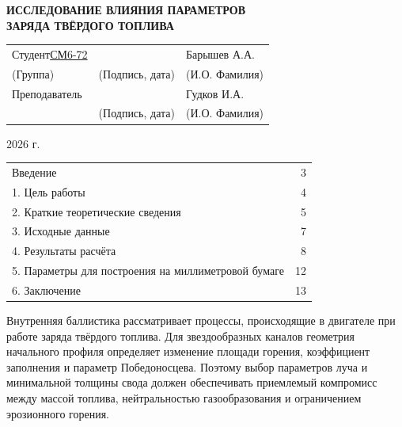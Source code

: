 \documentclass[a4paper,12pt]{article}
\newcommand{\heading}[1]{%
          \par\noindent{\centering\fontsize{16pt}{24pt}\selectfont\bfseries #1\par}%
        }
\begin{document}
\begin{titlepage}
\begin{center}
          {\fontsize{18}{22}\selectfont\bfseries ИССЛЕДОВАНИЕ ВЛИЯНИЯ ПАРАМЕТРОВ}\\
          {\fontsize{18}{22}\selectfont\bfseries ЗАРЯДА ТВЁРДОГО ТОПЛИВА}
        \end{center}
        \vspace{10mm}
        \noindent\begin{tabular}{@{}p{40mm}p{54mm}p{62mm}@{}}
        Студент\hspace{4mm}\underline{СМ6-72} & \hfill\underline{\hspace{36mm}} & Барышев А.А.\\[-1mm]
        \hspace{17mm}(Группа) & \hfill(Подпись, дата) & \hfill(И.О. Фамилия)\\[10mm]
        Преподаватель & \hfill\underline{\hspace{36mm}} & Гудков И.А.\\[-1mm]
        \hspace{28mm} & \hfill(Подпись, дата) & \hfill(И.О. Фамилия)
        \end{tabular}
        \vfill
        \begin{center}2026 г.\end{center}
        \end{titlepage}

        \setcounter{page}{2}
        \heading{Содержание}
        \noindent\begin{tabular}{@{}p{}r@{}}
        Введение & 3\\
        1. Цель работы & 4\\
        2. Краткие теоретические сведения & 5\\
        3. Исходные данные & 7\\
        4. Результаты расчёта & 8\\
        5. Параметры для построения на миллиметровой бумаге & 12\\
        6. Заключение & 13
        \end{tabular}


        \clearpage
        \heading{Введение}
        Внутренняя баллистика рассматривает процессы, происходящие в двигателе при работе заряда твёрдого топлива. Для звездообразных каналов геометрия начального профиля определяет изменение площади горения, коэффициент заполнения и параметр Победоносцева. Поэтому выбор параметров луча и минимальной толщины свода должен обеспечивать приемлемый компромисс между массой топлива, нейтральностью газообразования и ограничением эрозионного горения.
\end{document}
